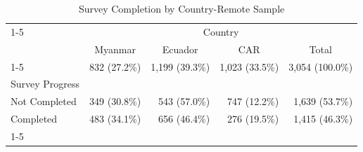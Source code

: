 \begin{table}[!h]
\caption{Survey Completion by Country-Remote Sample}
\centering
\begin{tabular}{lllll}
\cline{1-5}
\multicolumn{1}{r}{} &
  \multicolumn{4}{c}{Country} \\
\multicolumn{1}{r}{} &
  \multicolumn{1}{c}{Myanmar} &
  \multicolumn{1}{c}{Ecuador} &
  \multicolumn{1}{c}{CAR} &
  \multicolumn{1}{c}{Total} \\
\cline{1-5}
\multicolumn{1}{l}{N} &
  \multicolumn{1}{r}{832 (27.2\%)} &
  \multicolumn{1}{r}{1,199 (39.3\%)} &
  \multicolumn{1}{r}{1,023 (33.5\%)} &
  \multicolumn{1}{r}{3,054 (100.0\%)} \\
\multicolumn{1}{l}{Survey Progress} &
  \multicolumn{1}{r}{} &
  \multicolumn{1}{r}{} &
  \multicolumn{1}{r}{} &
  \multicolumn{1}{r}{} \\
\multicolumn{1}{l}{\hspace{1em}Not Completed} &
  \multicolumn{1}{r}{349 (30.8\%)} &
  \multicolumn{1}{r}{543 (57.0\%)} &
  \multicolumn{1}{r}{747 (12.2\%)} &
  \multicolumn{1}{r}{1,639 (53.7\%)} \\
\multicolumn{1}{l}{\hspace{1em}Completed} &
  \multicolumn{1}{r}{483 (34.1\%)} &
  \multicolumn{1}{r}{656 (46.4\%)} &
  \multicolumn{1}{r}{276 (19.5\%)} &
  \multicolumn{1}{r}{1,415 (46.3\%)} \\
\cline{1-5}
\end{tabular}
\end{table}
